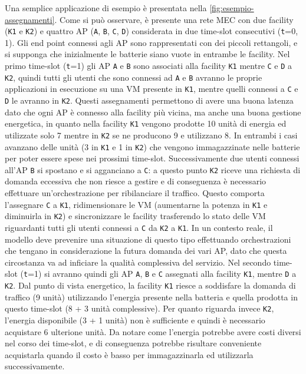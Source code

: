Una semplice applicazione di esempio è presentata nella \autoref{fig:esempio-assegnamenti}. Come si può osservare, è presente una rete MEC con due facility (\texttt{K1} e \texttt{K2}) e quattro AP (\texttt{A}, \texttt{B}, \texttt{C}, \texttt{D}) considerata in due time-slot consecutivi (\texttt{t}=0, 1). Gli end point connessi agli AP sono rappresentati con dei piccoli rettangoli, e si supponga che inizialmente le batterie siano vuote in entrambe le facility. Nel primo time-slot (\texttt{t}=1) gli AP \texttt{A} e \texttt{B} sono associati alla facility \texttt{K1} mentre \texttt{C} e \texttt{D} a \texttt{K2}, quindi tutti gli utenti che sono connessi ad \texttt{A} e \texttt{B} avranno le proprie applicazioni in esecuzione su una VM presente in \texttt{K1}, mentre quelli connessi a \texttt{C} e \texttt{D} le avranno in \texttt{K2}. Questi assegnamenti permettono di avere una buona latenza dato che ogni AP è connesso alla facility più vicina, ma anche una buona gestione energetica, in quanto nella facility \texttt{K1} vengono prodotte 10 unità di energia ed utilizzate solo 7 mentre in \texttt{K2} se ne producono 9 e utilizzano 8. In entrambi i casi avanzano delle unità (3 in \texttt{K1} e 1 in \texttt{K2}) che vengono immagazzinate nelle batterie per poter essere spese nei prossimi time-slot. Successivamente due utenti connessi all'AP \texttt{B} si spostano e si agganciano a \texttt{C}: a questo punto \texttt{K2} riceve una richiesta di domanda eccessiva che non riesce a gestire e di conseguenza è necessario effettuare un'orchestrazione per ribilanciare il traffico. Questo comporta l'assegnare \texttt{C} a \texttt{K1}, ridimensionare le VM (aumentarne la potenza in \texttt{K1} e diminuirla in \texttt{K2}) e sincronizzare le facility trasferendo lo stato delle VM riguardanti tutti gli utenti connessi a \texttt{C} da \texttt{K2} a \texttt{K1}. In un contesto reale, il modello deve prevenire una situazione di questo tipo effettuando orchestrazioni che tengano in considerazione la futura domanda dei vari AP, dato che questa circostanza va ad inficiare la qualità complessiva del servizio. Nel secondo time-slot (\texttt{t}=1) si avranno quindi gli AP \texttt{A}, \texttt{B} e \texttt{C} assegnati alla facility \texttt{K1}, mentre \texttt{D} a \texttt{K2}. Dal punto di vista energetico, la facility \texttt{K1} riesce a soddisfare la domanda di traffico (9 unità) utilizzando l'energia presente nella batteria e quella prodotta in questo time-slot (8 + 3 unità complessive). Per quanto riguarda invece \texttt{K2}, l'energia disponibile (3 + 1 unità) non è sufficiente e quindi è necessario acquistare 6 ulterione unità. Da notare come l'energia potrebbe avere costi diversi nel corso dei time-slot, e di conseguenza potrebbe risultare conveniente acquistarla quando il costo è basso per immagazzinarla ed utilizzarla successivamente.


